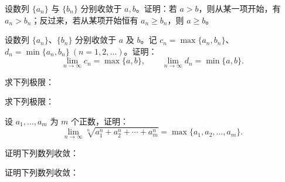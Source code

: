 \newpage
\noindent\begin{minipage}{\textwidth}
设数列 $\{a_n\}$ 与 $\{b_n\}$ 分别收敛于 $a,b$。证明：若 $a>b$，则从某一项开始，有 $a_n>b_n$；反过来，若从某项开始恒有 $a_n\ge b_n$，则 $a\ge b$。
\end{minipage}\par\vfill
\noindent\begin{minipage}{\textwidth}
设数列 $\{a_n\}$、$\{b_n\}$ 分别收敛于 $a$ 及 $b$。记 $c_n=\max\{a_n,b_n\}$、$d_n=\min\{a_n,b_n\}\ (n=1,2,\ldots)$。证明：\[\lim_{n\to\infty}c_n=\max\{a,b\},\qquad\lim_{n\to\infty}d_n=\min\{a,b\}.\]
\end{minipage}\par\vfill
\noindent\begin{minipage}{\textwidth}
求下列极限：
\end{minipage}\par\vfill
\noindent\begin{minipage}{\textwidth}
求下列极限：
\end{minipage}\par\vfill
\newpage
\noindent\begin{minipage}{\textwidth}
设 $a_1,\ldots,a_m$ 为 $m$ 个正数，证明：\[\lim_{n\to\infty}\sqrt[n]{a_1^n+a_2^n+\cdots+a_m^n}=\max\{a_1,a_2,\ldots,a_m\}.\]
\end{minipage}\par\vfill
\noindent\begin{minipage}{\textwidth}
证明下列数列收敛：
\end{minipage}\par\vfill
\noindent\begin{minipage}{\textwidth}
证明下列数列收敛：
\end{minipage}\par\vfill

